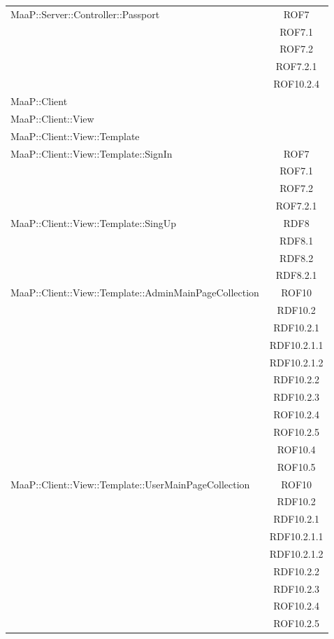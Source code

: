 \begin{center}
\begin{longtable}{|p{0.8\linewidth}|c|}
\midrule 
MaaP::Server::Controller::Passport
& ROF7\\
& ROF7.1\\
& ROF7.2\\
& ROF7.2.1\\
& ROF10.2.4\\

\midrule 
MaaP::Client 
& \\

\midrule 
MaaP::Client::View 
& \\

\midrule 
MaaP::Client::View::Template
& \\

\midrule 
MaaP::Client::View::Template::SignIn
& ROF7\\
& ROF7.1\\
& ROF7.2\\
& ROF7.2.1\\

\midrule 
MaaP::Client::View::Template::SingUp
& RDF8\\
& RDF8.1\\
& RDF8.2\\
& RDF8.2.1\\

\midrule 
MaaP::Client::View::Template::AdminMainPageCollection
& ROF10\\
& RDF10.2\\
& RDF10.2.1\\
& RDF10.2.1.1\\
& RDF10.2.1.2\\
& RDF10.2.2\\
& RDF10.2.3\\
& ROF10.2.4\\
& ROF10.2.5\\
& ROF10.4\\
& ROF10.5\\




\midrule 
MaaP::Client::View::Template::UserMainPageCollection
& ROF10\\
& RDF10.2\\
& RDF10.2.1\\
& RDF10.2.1.1\\
& RDF10.2.1.2\\
& RDF10.2.2\\
& RDF10.2.3\\
& ROF10.2.4\\
& ROF10.2.5\\


\end{longtable}
\end{center}
